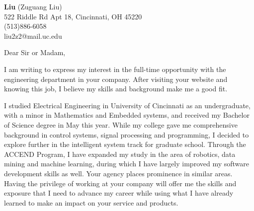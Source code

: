 \documentclass[11pt]{letter} %
\begin{document}

\begin{letter}
{\vspace{-15pt}}


\begin{center}
\large \textbf{Liu} (Zuguang Liu) \\ %
522 Riddle Rd Apt 18, Cincinnati, OH 45220 \\ (513)886-6058  \\ liu2z2@mail.uc.edu%
\end{center}


\signature{Liu (Zuguang Liu)} %


\opening{Dear Sir or Madam,}

\par I am writing to express my interest in the full-time opportunity with the engineering department in your company.
After visiting your website and knowing this job, I believe my skills and background make me a good fit.

\par I studied Electrical Engineering in University of Cincinnati as an undergraduate, with a minor in Mathematics and Embedded systems, and received my Bachelor of Science degree in May this year.
While my college gave me comprehensive background in control systems, signal processing and programming, I decided to explore further in the intelligent system track for graduate school.
Through the ACCEND Program, I have expanded my study in the area of robotics, data mining and machine learning, during which I have largely improved my software development skills as well.
Your agency places prominence in similar areas.
Having the privilege of working at your company will offer me the skills and exposure that I need to advance my career while using what I have already learned to make an impact on your service and products.


\end{letter}
\end{document}
